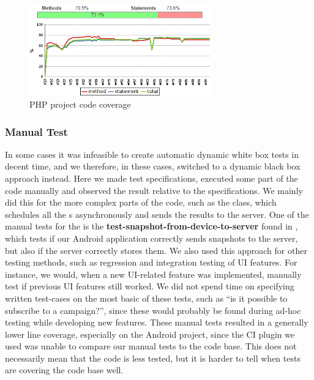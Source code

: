 \begin{figure}[!htbp]
    \centering
    \includegraphics[width=0.7\textwidth]{graphic/quality_assurance/jenkins_php_code_coverage}
    \caption{PHP project code coverage}
    \label{fig:php_project_code_coverage}
\end{figure}
\FloatBarrier

\subsubsection{Manual Test}
In some cases it was infeasible to create automatic dynamic white box tests in decent time, and we therefore, in these cases, switched to a dynamic black box approach instead. Here we made test specifications, executed some part of the code manually and observed the result relative to the specifications. We mainly did this for the more complex parts of the code, such as the  class, which schedules all the s asynchronously and sends the results to the server. One of the manual tests for the  is the \textbf{test-snapshot-from-device-to-server} found in , which tests if our Android application correctly sends snapshots to the server, but also if the server correctly stores them. We also used this approach for other testing methods, such as regression and integration testing of UI features. For instance, we would, when a new UI-related feature was implemented, manually test if previous UI features still worked. We did not spend time on specifying written test-cases on the most basic of these tests, such as ``is it possible to subscribe to a campaign?'', since these would probably be found during ad-hoc testing while developing new features.
\newpage
These manual tests resulted in a generally lower line coverage, especially on the Android project, since the CI plugin we used was unable to compare our manual tests to the code base. This does not necessarily mean that the code is less tested, but it is harder to tell when tests are covering the code base well. 

